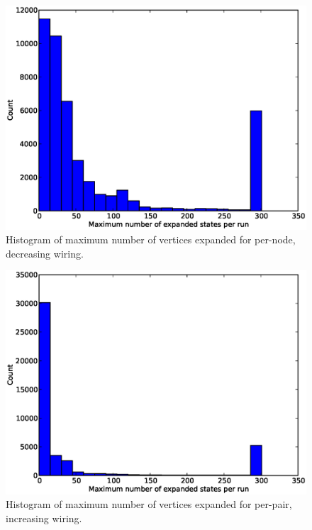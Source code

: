 \begin{figure}[H]
\begin{center}
\includegraphics[width=\textwidth]{Images/max_expanded_per_node_decreasing.eps}
\caption{Histogram of maximum number of vertices expanded for per-node,
decreasing wiring.}
\label{fig:max_expanded_per_node_decreasing}
\end{center}
\end{figure}

\begin{figure}[H]
\begin{center}
\includegraphics[width=\textwidth]{Images/max_expanded_per_pair_increasing.eps}
\caption{Histogram of maximum number of vertices expanded for per-pair,
increasing wiring.}
\label{fig:max_expanded_per_pair_increasing}
\end{center}
\end{figure}


